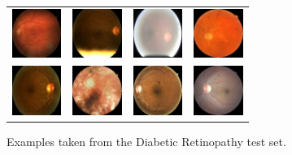 \documentclass[journal]{IEEEtran}
\begin{document}
\begin{itemize}
		\begin{figure}[!t]
			\centering
			\begin{tabular}{cccc}
			\includegraphics[width=1.6cm]{img/retinopathy/1.jpg} & \includegraphics[width=1.6cm]{img/retinopathy/2.jpg} & \includegraphics[width=1.6cm]{img/retinopathy/3.jpg} & \includegraphics[width=1.6cm]{img/retinopathy/4.jpg}\\
			\includegraphics[width=1.6cm]{img/retinopathy/5.jpg} & \includegraphics[width=1.6cm]{img/retinopathy/6.jpg} & \includegraphics[width=1.6cm]{img/retinopathy/7.jpg} & \includegraphics[width=1.6cm]{img/retinopathy/8.jpg}
			\end{tabular}						
			\caption{Examples taken from the Diabetic Retinopathy test set.}
			\label{fig:DRexamples}
		\end{figure}
		

\end{itemize}
\end{document}
